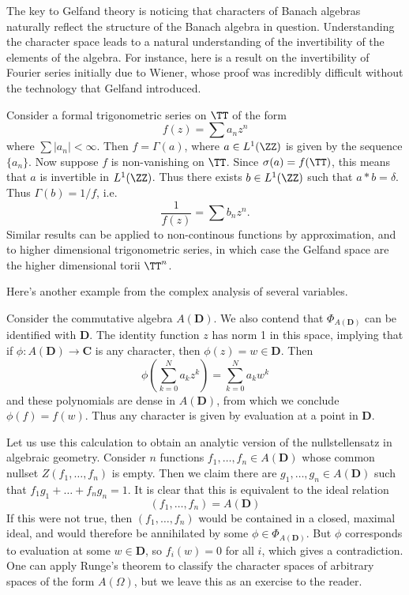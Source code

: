 The key to Gelfand theory is noticing that characters of Banach algebras naturally reflect the structure of the Banach algebra in question. Understanding the character space leads to a natural understanding of the invertibility of the elements of the algebra. For instance, here is a result on the invertibility of Fourier series initially due to Wiener, whose proof was incredibly difficult without the technology that Gelfand introduced.

\begin{example}
    Consider a formal trigonometric series on $\TT$ of the form
    \[ f(z) = \sum a_n z^n \]
    where $\sum |a_n| < \infty$. Then $f = \Gamma(a)$, where $a \in L^1(\ZZ)$ is given by the sequence $\{ a_n \}$. Now suppose $f$ is non-vanishing on $\TT$. Since $\sigma(a) = f(\TT)$, this means that $a$ is invertible in $L^1(\ZZ)$. Thus there exists $b \in L^1(\ZZ)$ such that $a * b = \delta$. Thus $\Gamma(b) = 1/f$, i.e.
    \[ \frac{1}{f(z)} = \sum b_n z^n. \]
    Similar results can be applied to non-continous functions by approximation, and to higher dimensional trigonometric series, in which case the Gelfand space are the higher dimensional torii $\TT^n$.
\end{example}

Here's another example from the complex analysis of several variables.

\begin{example}
    Consider the commutative algebra $A(\mathbf{D})$. We also contend that $\Phi_{A(\mathbf{D})}$ can be identified with $\mathbf{D}$. The identity function $z$ has norm 1 in this space, implying that if $\phi: A(\mathbf{D}) \to \mathbf{C}$ is any character, then $\phi(z) = w \in \mathbf{D}$. Then
    \[ \phi(\sum_{k = 0}^N a_k z^k) = \sum_{k = 0}^N a_k w^k \]
    and these polynomials are dense in $A(\mathbf{D})$, from which we conclude $\phi(f) = f(w)$. Thus any character is given by evaluation at a point in $\mathbf{D}$.

    Let us use this calculation to obtain an analytic version of the nullstellensatz in algebraic geometry. Consider $n$ functions $f_1, \dots, f_n \in A(\mathbf{D})$ whose common nullset $Z(f_1,\dots,f_n)$ is empty. Then we claim there are $g_1,\dots,g_n \in A(\mathbf{D})$ such that $f_1 g_1 + \dots + f_n g_n = 1$. It is clear that this is equivalent to the ideal relation
    \[ (f_1, \dots, f_n) = A(\mathbf{D}) \]
    If this were not true, then $(f_1, \dots, f_n)$ would be contained in a closed, maximal ideal, and would therefore be annihilated by some $\phi \in \Phi_{A(\mathbf{D})}$. But $\phi$ corresponds to evaluation at some $w \in \mathbf{D}$, so $f_i(w) = 0$ for all $i$, which gives a contradiction. One can apply Runge's theorem to classify the character spaces of arbitrary spaces of the form $A(\Omega)$, but we leave this as an exercise to the reader.
\end{example}

